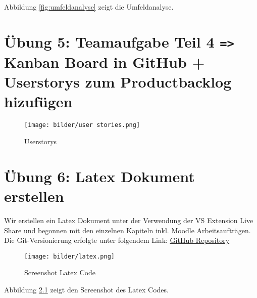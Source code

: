 \documentclass[a4paper,12pt]{report}
\begin{document}
Abbildung \ref{fig:umfeldanalyse} zeigt die Umfeldanalyse.

\chapter{Übung 5: Teamaufgabe Teil 4 \texttt{=>} Kanban Board in GitHub + Userstorys zum Productbacklog hizufügen}
\begin{figure}[h]
    \centering
    \texttt{[image: bilder/user stories.png]}
    \caption{Userstorys}
    \label{fig:user stories}
\end{figure}

\chapter{Übung 6: Latex Dokument erstellen}

Wir erstellen ein Latex Dokument unter der Verwendung der VS Extension Live Share und begonnen mit den einzelnen Kapiteln inkl. Moodle Arbeitsaufträgen. Die Git-Versionierung erfolgte unter folgendem Link: \href{https://github.com/ellkoell/latex_swpp.git}{GitHub Repository}

\begin{figure}[h]
    \centering
    \texttt{[image: bilder/latex.png]}
    \caption{Screenshot Latex Code}
    \label{fig:Latex Code}
\end{figure}

Abbildung \ref{fig:Latex Code} zeigt den Screenshot des Latex Codes.
\end{document}
